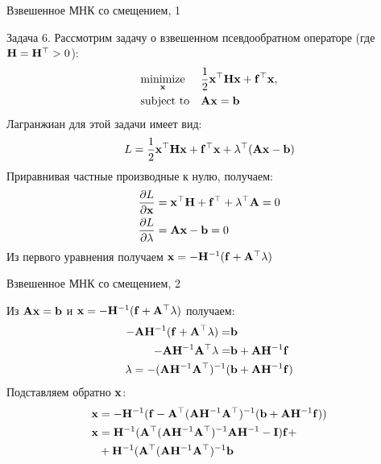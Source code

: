 \documentclass{beamer}
\begin{document}
\begin{frame}{Взвешенное МНК со смещением, 1}
	\begin{flushleft}
		
		Задача 6. Рассмотрим задачу о взвешенном псевдообратном операторе (где $\mathbf{H} = \mathbf{H}^\top > 0$):
		\begin{equation}
			\begin{aligned}
				& \underset{\mathbf{x}}{\text{minimize}}
				& & \frac{1}{2} \mathbf{x}^\top \mathbf{H} \mathbf{x} + \mathbf{f}^\top \mathbf{x} , \\
				& \text{subject to}
				& & \mathbf{A}\mathbf{x}=\mathbf{b}
			\end{aligned}
		\end{equation}
		Лагранжиан для этой задачи имеет вид:
		\begin{align}
			L = \frac{1}{2} \mathbf{x}^\top \mathbf{H} \mathbf{x} + \mathbf{f}^\top \mathbf{x} + \lambda^\top (\mathbf{A}\mathbf{x}-\mathbf{b})
		\end{align}
		Приравнивая частные производные к нулю, получаем:
		\begin{align}
			\frac{\partial L}{\partial \mathbf{x}} &=
			\mathbf{x}^\top \mathbf{H}  + \mathbf{f}^\top + \lambda^\top \mathbf{A} = 0 
			\\
			\frac{\partial L}{\partial \lambda} &= \mathbf{A}\mathbf{x}-\mathbf{b} = 0
		\end{align}		
		Из первого уравнения получаем $\mathbf{x}  = -\mathbf{H}^{-1}(\mathbf{f} + \mathbf{A}^\top \lambda)$
		
	\end{flushleft}
\end{frame}

\begin{frame}{Взвешенное МНК со смещением, 2}
	\begin{flushleft}
		
		Из $\mathbf{A}\mathbf{x}=\mathbf{b}$ и $\mathbf{x}  = -\mathbf{H}^{-1}(\mathbf{f} + \mathbf{A}^\top \lambda)$ получаем:
		\begin{align}
			-\mathbf{A}\mathbf{H}^{-1}(\mathbf{f} + \mathbf{A}^\top \lambda)=&\mathbf{b}
			\\
			-\mathbf{A}\mathbf{H}^{-1} \mathbf{A}^\top \lambda = &\mathbf{b} + \mathbf{A}\mathbf{H}^{-1}\mathbf{f}
			\\
			\lambda = -(\mathbf{A}\mathbf{H}^{-1} \mathbf{A}^\top)^{-1}(&\mathbf{b} + \mathbf{A}\mathbf{H}^{-1}\mathbf{f})
		\end{align}		
		Подставляем обратно $\mathbf{x}$: 
		\begin{align}
			\mathbf{x}  &= -\mathbf{H}^{-1}(\mathbf{f} - \mathbf{A}^\top (\mathbf{A}\mathbf{H}^{-1} \mathbf{A}^\top)^{-1}(\mathbf{b} + \mathbf{A}\mathbf{H}^{-1}\mathbf{f}))
			\\
			\mathbf{x}  &= \mathbf{H}^{-1}(\mathbf{A}^\top (\mathbf{A}\mathbf{H}^{-1} \mathbf{A}^\top)^{-1} \mathbf{A}\mathbf{H}^{-1}-\mathbf{I})\mathbf{f}
			+ \\ &+
			\mathbf{H}^{-1} (\mathbf{A}^\top (\mathbf{A}\mathbf{H}^{-1} \mathbf{A}^\top)^{-1} \mathbf{b} 
		\end{align}		
		
		
	\end{flushleft}
\end{frame}
\end{document}
